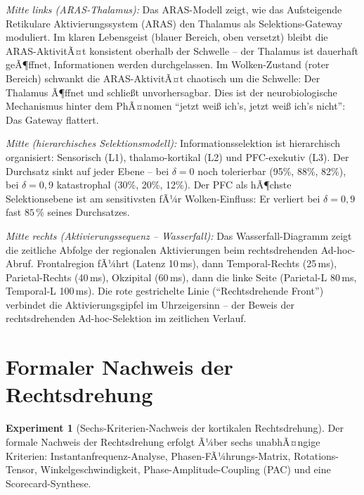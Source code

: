 ﻿\documentclass[12pt,a4paper]{report}
\theoremstyle{plain}
\theoremstyle{definition}
\newtheorem{experiment}[theorem]{Experiment}
\theoremstyle{remark}
\begin{document}
	\textit{Mitte links (ARAS-Thalamus):}
	Das ARAS-Modell zeigt, wie das Aufsteigende Retikulare Aktivierungssystem
	(ARAS) den Thalamus als Selektions-Gateway moduliert.
	Im klaren Lebensgeist (blauer Bereich, oben versetzt) bleibt die ARAS-AktivitÃ¤t
	konsistent oberhalb der Schwelle -- der Thalamus ist dauerhaft geÃ¶ffnet,
	Informationen werden durchgelassen.
	Im Wolken-Zustand (roter Bereich) schwankt die ARAS-AktivitÃ¤t chaotisch
	um die Schwelle: Der Thalamus Ã¶ffnet und schlie\ss{}t unvorhersagbar.
	Dies ist der neurobiologische Mechanismus hinter dem PhÃ¤nomen
	``jetzt wei\ss{} ich's, jetzt wei\ss{} ich's nicht'': Das Gateway flattert.

	\textit{Mitte (hierarchisches Selektionsmodell):}
	Informationsselektion ist hierarchisch organisiert: Sensorisch (L1),
	thalamo-kortikal (L2) und PFC-exekutiv (L3). Der Durchsatz sinkt
	auf jeder Ebene -- bei $\delta = 0$ noch tolerierbar (95\%, 88\%, 82\%),
	bei $\delta = 0{,}9$ katastrophal (30\%, 20\%, 12\%).
	Der PFC als hÃ¶chste Selektionsebene ist am sensitivsten fÃ¼r Wolken-Einfluss:
	Er verliert bei $\delta = 0{,}9$ fast $85\,\%$ seines Durchsatzes.

	\textit{Mitte rechts (Aktivierungssequenz -- Wasserfall):}
	Das Wasserfall-Diagramm zeigt die zeitliche Abfolge der regionalen Aktivierungen
	beim rechtsdrehenden Ad-hoc-Abruf. Frontalregion fÃ¼hrt (Latenz 10\,ms),
	dann Temporal-Rechts (25\,ms), Parietal-Rechts (40\,ms), Okzipital (60\,ms),
	dann die linke Seite (Parietal-L 80\,ms, Temporal-L 100\,ms).
	Die rote gestrichelte Linie (``Rechtsdrehende Front'') verbindet die
	Aktivierungsgipfel im Uhrzeigersinn -- der Beweis der rechtsdrehenden
	Ad-hoc-Selektion im zeitlichen Verlauf.
	
	\section{Formaler Nachweis der Rechtsdrehung}
	
	\begin{experiment}[Sechs-Kriterien-Nachweis der kortikalen Rechtsdrehung]
		Der formale Nachweis der Rechtsdrehung erfolgt Ã¼ber sechs unabhÃ¤ngige
		Kriterien: Instantanfre\-quenz-Analyse, Phasen-FÃ¼hrungs-Matrix,
		Rotations-Tensor, Winkelgeschwindigkeit, Pha\-se-Am\-pli\-tude-Coupling (PAC)
		und eine Scorecard-Synthese.
	\end{experiment}
	
\end{document}
